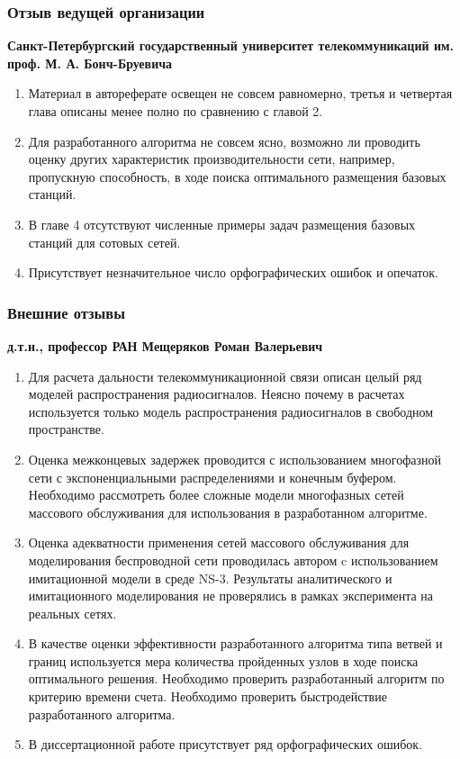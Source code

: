 \begin{frame}
    \frametitle{Отзыв ведущей организации}
    \fontsize{8pt}{7.2}\selectfont
    \textbf{Санкт-Петербургский государственный университет телекоммуникаций им. проф. М. А. Бонч-Бруевича}

    \bigskip

    \begin{enumerate}
        \item Материал в автореферате освещен не совсем равномерно, третья и четвертая глава описаны менее полно по сравнению с главой 2.
        \item Для разработанного алгоритма не совсем ясно, возможно ли проводить оценку других характеристик производительности сети, например, пропускную способность, в ходе поиска оптимального размещения базовых станций.
        \item В главе 4 отсутствуют численные примеры задач размещения базовых станций для сотовых сетей.
        \item Присутствует незначительное число орфографических ошибок и опечаток.
        
    \end{enumerate}
\end{frame}


\begin{frame}
    \frametitle{Внешние отзывы}
    \fontsize{8pt}{7.2}\selectfont
    \textbf{д.т.н., профессор РАН Мещеряков Роман Валерьевич}

    \bigskip

    \begin{enumerate}
        \item Для расчета дальности телекоммуникационной связи описан целый ряд моделей распространения радиосигналов. Неясно почему в расчетах используется только модель распространения радиосигналов в свободном пространстве.
        \item Оценка межконцевых задержек проводится с использованием многофазной сети с экспоненциальными распределениями и конечным буфером. Необходимо рассмотреть более сложные модели многофазных сетей массового обслуживания для использования в разработанном алгоритме.
        \item Оценка адекватности применения сетей массового обслуживания для моделирования беспроводной сети проводилась автором c использованием имитационной модели в среде NS-3. Результаты аналитического и имитационного моделирования не проверялись в рамках эксперимента на реальных сетях.
        \item В качестве оценки эффективности разработанного алгоритма типа ветвей и границ используется мера количества пройденных узлов в ходе поиска оптимального решения. Необходимо проверить разработанный алгоритм по критерию времени счета. Необходимо проверить быстродействие разработанного алгоритма.
        \item В диссертационной работе присутствует ряд орфографических ошибок.
        
    \end{enumerate}
\end{frame}

